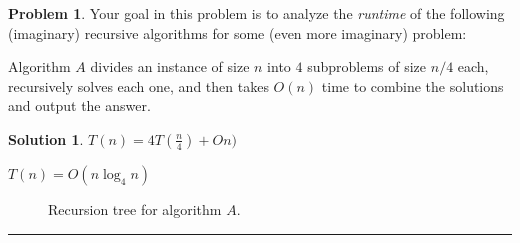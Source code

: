 \documentclass{article}
\theoremstyle{definition}
\newtheorem{problem}{Problem}
\def\fline{\rule{0.75\linewidth}{0.5pt}}
\newcommand{\finishline}{\begin{center}\fline\end{center}}
\newtheorem*{solution*}{Solution}
\newenvironment{solution}{\begin{solution*}}{{\finishline} \end{solution*}}
\begin{document}
		
\begin{problem}
	Your goal in this problem is to analyze the \emph{runtime} of the following (imaginary) recursive algorithms for some (even more imaginary) problem:
	\begin{enumerate}[label=(\Alph*)]
	
		\item Algorithm $A$ divides an instance of size $n$ into $4$ subproblems of size $n/4$ each, recursively solves each one, and then takes $O(n)$ time 
		to combine the solutions and output the answer.
		
		    \begin{solution}
	\item $T(n) = 4T(\frac{n}{4}) + On)$
 	\item $T(n) = O(n\log_4 n)$
	

		\begin{figure}[h!]
			\centering
		\caption{Recursion tree for algorithm $A$.} 
		\end{figure}
		

\end{solution}
\end{enumerate}
\end{problem}
\end{document}
